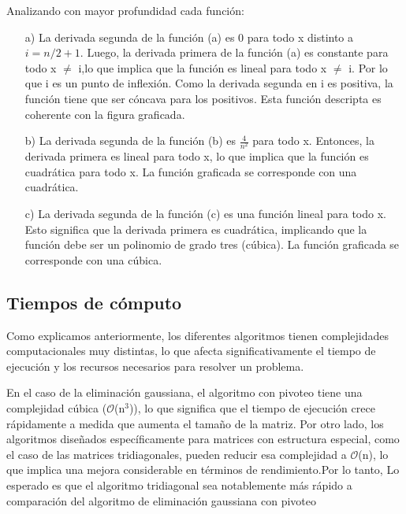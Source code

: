     Analizando con mayor profundidad cada función:\par
    \begin{enumerate}
        \item[a)] La derivada segunda de la función (a) es 0 para todo x distinto a $i = n/2 + 1$. Luego, la derivada primera de la función (a) es constante para todo x $\not =$ i,lo que implica que la función es lineal para todo x $\not =$ i. Por lo que i es un punto de inflexión. Como la derivada segunda en i es positiva, la función tiene que ser cóncava para los positivos. Esta función descripta es coherente con la figura graficada.
    
        \item[b)] La derivada segunda de la función (b) es $\frac{4}{n^2}$ para todo x. Entonces, la derivada primera es lineal para todo x, lo que implica que la función es cuadrática para todo x. La función graficada se corresponde con una cuadrática.

        \item[c)] La derivada segunda de la función (c) es una función lineal para todo x. Esto significa que la derivada primera es cuadrática, implicando que la función debe ser un polinomio de grado tres (cúbica). La función graficada se corresponde con una cúbica.
    \end{enumerate}



    \subsection{Tiempos de cómputo}
    Como explicamos anteriormente, los diferentes algoritmos tienen complejidades computacionales muy distintas, lo que afecta significativamente el tiempo de ejecución y los recursos necesarios para resolver un problema.

    En el caso de la eliminación gaussiana, el algoritmo con pivoteo tiene una complejidad cúbica ($\mathcal{O}$(n$^3$)), lo que significa que el tiempo de ejecución crece rápidamente a medida que aumenta el tamaño de la matriz. Por otro lado, los algoritmos diseñados específicamente para matrices con estructura especial, como el caso de las matrices tridiagonales, pueden reducir esa complejidad a $\mathcal{O}$(n), lo que implica una mejora considerable en términos de rendimiento.Por lo tanto, Lo esperado es que el algoritmo tridiagonal sea notablemente más rápido a comparación del algoritmo de eliminación gaussiana con pivoteo

